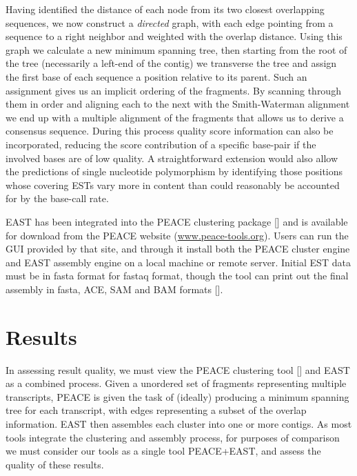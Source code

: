 \documentclass{bioinfo}
\newcommand{\peace} {{\small PEACE}}
\newcommand{\east} {{\small EAST}}
\newcommand{\peast}{{\small PEACE+EAST}}
\begin{document}

Having identified the distance of each node from its two closest
overlapping sequences, we now construct a {\it directed} graph, with
each edge pointing from a sequence to a right neighbor and weighted
with the overlap distance.  Using this graph we calculate a new
minimum spanning tree, then starting from the root of the tree
(necessarily a left-end of the contig) we transverse the tree and
assign the first base of each sequence a position relative to its
parent.  Such an assignment gives us an implicit ordering of the
fragments.  By scanning through them in order and aligning each to
the next with the Smith-Waterman alignment we end up with a multiple
alignment of the fragments that allows us to derive a consensus
sequence.  During this process quality score information can also be
incorporated, reducing the score contribution of a specific base-pair
if the involved bases are of low quality.  A straightforward extension
would also allow the predictions of single nucleotide polymorphism by
identifying those positions whose covering ESTs vary more in content
than could reasonably be accounted for by the base-call rate.

 \east\/ has been integrated into the
\peace\/ clustering package [\cite{Rao10}] and is available for
download from the \peace\/ website (\url{www.peace-tools.org}).
Users can run the GUI provided by that site, and through it
install both the \peace\/ cluster engine and \east\/ assembly engine
on a local machine or remote server.
Initial EST data must be in fasta format for fastaq format, though the tool can print
out the final assembly in fasta, ACE, SAM and BAM formats [\cite{Li09}].

 
\section*{Results}

In assessing result quality, we must view the \peace\/ clustering tool
[\cite{Rao10}] and \east\/ as a combined process.  Given a unordered
set of fragments representing multiple transcripts, \peace\/ is given
the task of (ideally) producing a minimum spanning tree for each transcript,
with edges representing a subset of the overlap information.  \east\/
then assembles each cluster into one or more contigs.  As most tools
integrate the clustering and assembly process, for purposes of
comparison we must consider our tools as a single tool \peast, and
assess the quality of these results.
\end{document}
